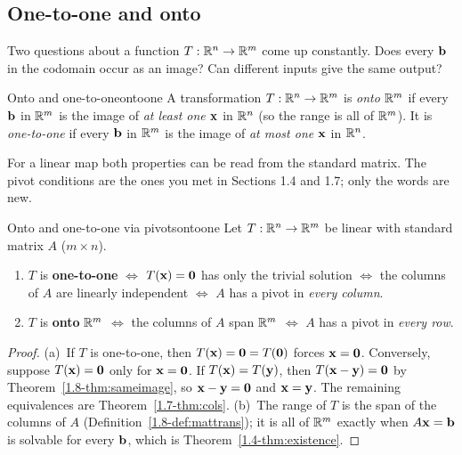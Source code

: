 \documentclass[11pt]{article}
\begin{document}
\subsection*{One-to-one and onto}

Two questions about a function $T:\mathbb{R}^n\to\mathbb{R}^m$ come up constantly. Does every $\mathbf{b}$ in the codomain occur as an image? Can different inputs give the same output?

\begin{defn}{Onto and one-to-one}{ontoone}
A transformation $T:\mathbb{R}^n\to\mathbb{R}^m$ is \emph{onto} $\mathbb{R}^m$ if every $\mathbf{b}$ in $\mathbb{R}^m$ is the image of \emph{at least one} $\mathbf{x}$ in $\mathbb{R}^n$ (so the range is all of $\mathbb{R}^m$). It is \emph{one-to-one} if every $\mathbf{b}$ in $\mathbb{R}^m$ is the image of \emph{at most one} $\mathbf{x}$ in $\mathbb{R}^n$.
\end{defn}

For a linear map both properties can be read from the standard matrix. The pivot conditions are the ones you met in Sections 1.4 and 1.7; only the words are new.

\begin{thm}{Onto and one-to-one via pivots}{ontoone}
Let $T:\mathbb{R}^n\to\mathbb{R}^m$ be linear with standard matrix $A$ ($m\times n$).
\begin{enumerate}[label=(\alph*),itemsep=1pt]
  \item $T$ is \textbf{one-to-one} $\iff$ $T(\mathbf{x})=\mathbf{0}$ has only the trivial solution $\iff$ the columns of $A$ are linearly independent $\iff$ $A$ has a pivot in \emph{every column}.
  \item $T$ is \textbf{onto} $\mathbb{R}^m$ $\iff$ the columns of $A$ span $\mathbb{R}^m$ $\iff$ $A$ has a pivot in \emph{every row}.
\end{enumerate}
\end{thm}

\begin{proof}
(a)~If $T$ is one-to-one, then $T(\mathbf{x})=\mathbf{0}=T(\mathbf{0})$ forces $\mathbf{x}=\mathbf{0}$. Conversely, suppose $T(\mathbf{x})=\mathbf{0}$ only for $\mathbf{x}=\mathbf{0}$. If $T(\mathbf{x})=T(\mathbf{y})$, then $T(\mathbf{x}-\mathbf{y})=\mathbf{0}$ by Theorem~\ref{1.8-thm:sameimage}, so $\mathbf{x}-\mathbf{y}=\mathbf{0}$ and $\mathbf{x}=\mathbf{y}$. The remaining equivalences are Theorem~\ref{1.7-thm:cols}.
(b)~The range of $T$ is the span of the columns of $A$ (Definition~\ref{1.8-def:mattrans}); it is all of $\mathbb{R}^m$ exactly when $A\mathbf{x}=\mathbf{b}$ is solvable for every $\mathbf{b}$, which is Theorem~\ref{1.4-thm:existence}.
\end{proof}
\end{document}
